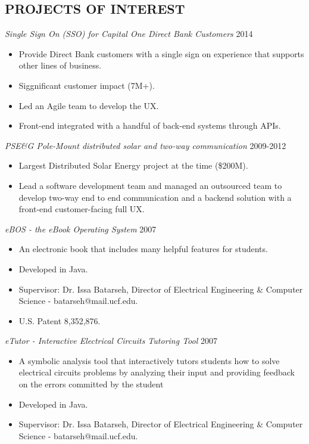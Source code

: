 \documentclass[line,margin]{res}
\begin{document}
\begin{resume}
\section{PROJECTS OF INTEREST}

{\sl Single Sign On (SSO) for Capital One Direct Bank Customers} \hfill   2014 \\
\begin{itemize} \itemsep -2pt
     \item Provide Direct Bank customers with a single sign on experience
            that supports other lines of business.
     \item Siggnificant customer impact (7M+).
     \item Led an Agile team to develop the UX.
     \item Front-end integrated with a handful of back-end systems through APIs.
\end{itemize}

{\sl PSE\&G Pole-Mount distributed solar and two-way communication} \hfill   2009-2012 \\
\begin{itemize} \itemsep -2pt
     \item Largest Distributed Solar Energy project at the time (\$200M).
     \item Lead a software development team and managed an outsourced team
            to develop two-way end to end communication and a backend solution with
            a front-end customer-facing full UX.
\end{itemize}

{\sl eBOS - the eBook Operating System} \hfill   2007 \\
\begin{itemize} \itemsep -2pt
     \item An electronic book that includes many helpful features for students.
     \item Developed in Java.
     \item Supervisor: Dr. Issa Batarseh, Director of Electrical Engineering \&
     Computer Science - batarseh@mail.ucf.edu.
     \item U.S. Patent 8,352,876.
\end{itemize}

{\sl eTutor - Interactive Electrical Circuits Tutoring Tool} \hfill   2007 \\
\begin{itemize} \itemsep -2pt
     \item A symbolic analysis tool that interactively tutors students how to
     solve electrical circuits problems by analyzing their input and providing
     feedback on the errors committed by the student
     \item Developed in Java.
     \item Supervisor: Dr. Issa Batarseh, Director of Electrical Engineering \&
     Computer Science - batarseh@mail.ucf.edu.
\end{itemize}


\end{resume}
\end{document}
